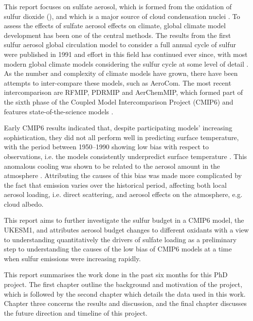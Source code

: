 This report focuses on sulfate aerosol, which is formed from the oxidation of sulfur dioxide (), and which is a major source of cloud condensation nuclei \citep{boucherCloudsAerosols2014}. To assess the effects of sulfate aerosol effects on climate, global climate model development has been one of the central methods. The results from the first sulfur aerosol global circulation model to consider a full annual cycle of sulfur were published in 1991 and effort in this field has continued ever since, with most modern global climate models considering the sulfur cycle at some level of detail \citep{langnerGlobalThreedimensionalModel1991, liAssessmentCoupledModel2021}. As the number and complexity of climate models have grown, there have been attempts to inter-compare these models, such as AeroCom. The most recent intercomparison are RFMIP, PDRMIP and AerChemMIP, which formed part of the sixth phase of the Coupled Model Intercomparison Project (CMIP6) and features state-of-the-science models \citep[e.g.][]{eyringOverviewCoupledModel2016, collinsAerChemMIPQuantifyingEffects2017, gillettDetectionAttributionModel2016}. 

Early CMIP6 results indicated that, despite participating models' increasing sophistication, they did not all perform well in predicting surface temperature, with the period between 1950--1990 showing low bias with respect to observations, i.e. the models consistently underpredict surface temperature \citep{flynnClimateSensitivityHistorical2020, zhangRoleAnthropogenicAerosols2021}. This anomalous cooling was shown to be related to the aerosol amount in the atmosphere \citep{zhangRoleAnthropogenicAerosols2021}. Attributing the causes of this bias was made more complicated by the fact that  emission varies over the historical period, affecting both local aerosol loading, i.e. direct scattering, and aerosol effects on the atmosphere, e.g. cloud albedo.

This report aims to further investigate the sulfur budget in a CMIP6 model, the UKESM1, and attributes aerosol budget changes to different oxidants with a view to understanding quantitatively the drivers of sulfate loading as a preliminary step to understanding the causes of the low bias of CMIP6 models at a time when sulfur emissions were increasing rapidly. 

This report summarises the work done in the past six months for this PhD project. The first chapter outline the background and motivation of the project, which is followed by the second chapter which details the data used in this work. Chapter three concerns the results and discussion, and the final chapter discusses the future direction and timeline of this project.


